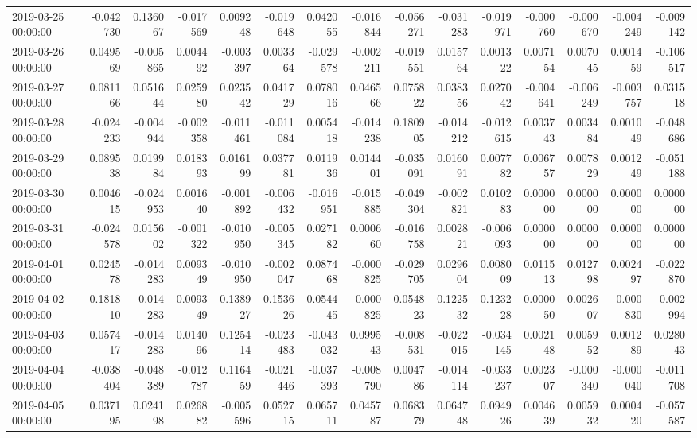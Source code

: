 \begin{tabular}{lrrrrrrrrrrrrrr}
2019-03-25 00:00:00 & -0.042730 & 0.136067 & -0.017569 & 0.009248 & -0.019648 & 0.042055 & -0.016844 & -0.056271 & -0.031283 & -0.019971 & -0.000760 & -0.000670 & -0.004249 & -0.009142 \\
2019-03-26 00:00:00 & 0.049569 & -0.005865 & 0.004492 & -0.003397 & 0.003364 & -0.029578 & -0.002211 & -0.019551 & 0.015764 & 0.001322 & 0.007154 & 0.007045 & 0.001459 & -0.106517 \\
2019-03-27 00:00:00 & 0.081166 & 0.051644 & 0.025980 & 0.023542 & 0.041729 & 0.078016 & 0.046566 & 0.075822 & 0.038356 & 0.027042 & -0.004641 & -0.006249 & -0.003757 & 0.031518 \\
2019-03-28 00:00:00 & -0.024233 & -0.004944 & -0.002358 & -0.011461 & -0.011084 & 0.005418 & -0.014238 & 0.180905 & -0.014212 & -0.012615 & 0.003743 & 0.003484 & 0.001049 & -0.048686 \\
2019-03-29 00:00:00 & 0.089538 & 0.019984 & 0.018393 & 0.016199 & 0.037781 & 0.011936 & 0.014401 & -0.035091 & 0.016091 & 0.007782 & 0.006757 & 0.007829 & 0.001249 & -0.051188 \\
2019-03-30 00:00:00 & 0.004615 & -0.024953 & 0.001640 & -0.001892 & -0.006432 & -0.016951 & -0.015885 & -0.049304 & -0.002821 & 0.010283 & 0.000000 & 0.000000 & 0.000000 & 0.000000 \\
2019-03-31 00:00:00 & -0.024578 & 0.015602 & -0.001322 & -0.010950 & -0.005345 & 0.027182 & 0.000660 & -0.016758 & 0.002821 & -0.006093 & 0.000000 & 0.000000 & 0.000000 & 0.000000 \\
2019-04-01 00:00:00 & 0.024578 & -0.014283 & 0.009349 & -0.010950 & -0.002047 & 0.087468 & -0.000825 & -0.029705 & 0.029604 & 0.008009 & 0.011513 & 0.012798 & 0.002497 & -0.022870 \\
2019-04-02 00:00:00 & 0.181810 & -0.014283 & 0.009349 & 0.138927 & 0.153626 & 0.054445 & -0.000825 & 0.054823 & 0.122532 & 0.123228 & 0.000050 & 0.002607 & -0.000830 & -0.002994 \\
2019-04-03 00:00:00 & 0.057417 & -0.014283 & 0.014096 & 0.125414 & -0.023483 & -0.043032 & 0.099543 & -0.008531 & -0.022015 & -0.034145 & 0.002148 & 0.005952 & 0.001289 & 0.028043 \\
2019-04-04 00:00:00 & -0.038404 & -0.048389 & -0.012787 & 0.116459 & -0.021446 & -0.037393 & -0.008790 & 0.004786 & -0.014114 & -0.033237 & 0.002307 & -0.000340 & -0.000040 & -0.011708 \\
2019-04-05 00:00:00 & 0.037195 & 0.024198 & 0.026882 & -0.005596 & 0.052715 & 0.065711 & 0.045787 & 0.068379 & 0.064748 & 0.094926 & 0.004639 & 0.005932 & 0.000420 & -0.057587 \\

\end{tabular}
